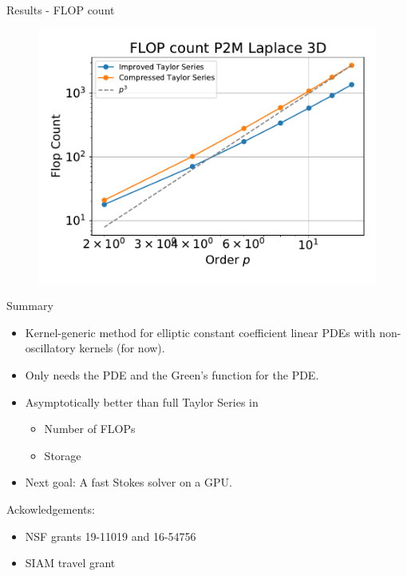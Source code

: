 \documentclass[10pt,usenames,dvipsnames]{beamer}
\begin{document}
\begin{frame}[fragile]{Results - FLOP count}
\begin{figure}
\includegraphics[scale=0.3]{figures/flops-laplace-P2M-3d.pdf}
\end{figure}
\end{frame}

\begin{frame}[fragile]{Summary}
\begin{itemize}
 \item Kernel-generic method for elliptic constant coefficient linear PDEs
     with non-oscillatory kernels (for now).
 \item Only needs the PDE and the Green's function for the PDE.
 \item Asymptotically better than full Taylor Series in
    \begin{itemize}
     \item Number of FLOPs
     \item Storage
    \end{itemize}
  \item Next goal: A fast Stokes solver on a GPU.
\end{itemize}

Ackowledgements: 
    \begin{itemize}
        \item NSF grants 19-11019 and 16-54756
        \item SIAM travel grant
    \end{itemize}
\end{frame}
\end{document}
